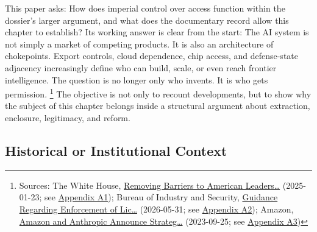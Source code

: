 \documentclass[
  american,
  11pt,
  letterpaper,
]{article}
\begin{document}
This paper asks: How does imperial control over access function within
the dossier's larger argument, and what does the documentary record
allow this chapter to establish? Its working answer is clear from the
start: The AI system is not simply a market of competing products. It is
also an architecture of chokepoints. Export controls, cloud dependence,
chip access, and defense-state adjacency increasingly define who can
build, scale, or even reach frontier intelligence. The question is no
longer only who invents. It is who gets permission. \footnote{Sources:
  The White House,
  \href{https://www.whitehouse.gov/presidential-actions/2025/01/removing-barriers-to-american-leadership-in-artificial-intelligence/}{Removing
  Barriers to American Leaders\ldots{}} (2025-01-23; see
  \hyperref[ch-07-appendix-a1-removing-barriers-to-american-leadership-in-artificial-intelligence]{Appendix
  A1}); Bureau of Industry and Security,
  \href{https://www.bis.gov/media/documents/bis-guidance-may-31-2026.pdf}{Guidance
  Regarding Enforcement of Lic\ldots{}} (2026-05-31; see
  \hyperref[ch-07-appendix-a2-guidance-regarding-enforcement-of-license-requirements-for-advanced-computing-items-for-entities-headquartered-in-country-group-d-5-and-macau]{Appendix
  A2}); Amazon,
  \href{https://press.aboutamazon.com/2023/9/amazon-and-anthropic-announce-strategic-collaboration-to-advance-generative-ai}{Amazon
  and Anthropic Announce Strateg\ldots{}} (2023-09-25; see
  \hyperref[ch-07-appendix-a3-amazon-and-anthropic-announce-strategic-collaboration-to-advance-generative-ai]{Appendix
  A3})} The objective is not only to recount developments, but to show
why the subject of this chapter belongs inside a structural argument
about extraction, enclosure, legitimacy, and reform.

\subsection{Historical or Institutional
Context}\label{historical-or-institutional-context-7}
\end{document}
